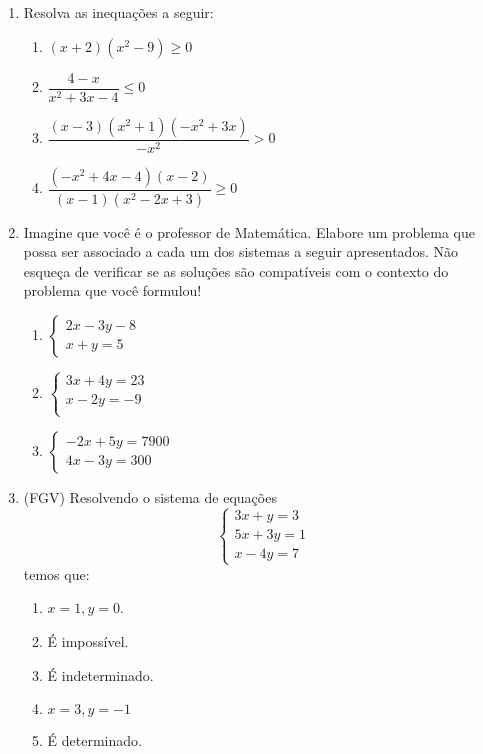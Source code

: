 \begin{enumerate}
\item Resolva as inequações a seguir:

\begin{enumerate}
\item $(x+2)(x^2-9)\geq0$
\item $\dfrac{4-x}{x^2+3x-4}\leq0$
\item $\dfrac{(x-3)(x^2+1)(-x^2+3x)}{-x^2}>0$
\item $\dfrac{(-x^2+4x-4)(x-2)}{(x-1)(x^2-2x+3)}\geq0$
\end{enumerate}

\item Imagine que você é o professor de Matemática. Elabore um problema que possa ser associado a cada um dos sistemas a seguir apresentados. Não esqueça de verificar se as soluções são compatíveis com o contexto do problema que você formulou!

\begin{enumerate}
\item $\left \{
\begin{aligned}
2x-3y-8\\
x+y=5
\end{aligned}
\right.$

\item 
$\left \{
\begin{aligned}
3x+4y=23\\
x-2y=-9\\
\end{aligned}
\right.$

\item 
$\left \{
\begin{aligned}
-2x+5y=7900\\
4x-3y=300
\end{aligned}
\right.$
\end{enumerate}

\item (FGV) Resolvendo o sistema de equações
\begin{equation*}
\left \{
\begin{aligned}
3x+y=3\\
5x+3y=1\\
x-4y=7
\end{aligned}
\right.
\end{equation*}
temos que:
\begin{enumerate}
\item $x=1,y=0$.
\item É impossível.
\item É indeterminado.
\item $x=3,y=-1$
\item É determinado.
\end{enumerate}



\end{enumerate}
